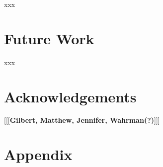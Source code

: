 \documentclass[letterpaper]{article}
\begin{document}
xxx

\section{Future Work}
\label{sec:future}

xxx

\section{Acknowledgements}
\label{sec:ack}

[[[\textbf{Gilbert, Matthew, Jennifer, Wahrman(?)}]]]







\appendix
\onecolumn
\section{Appendix}
\label{sec:appendix}
\end{document}
